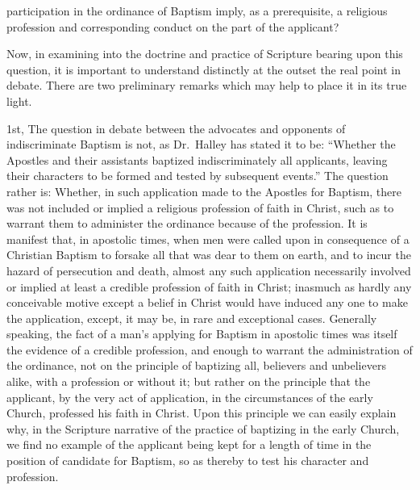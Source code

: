 \documentclass[]{book}
\begin{document}
participation in the ordinance of Baptism imply, as a prerequisite, a religious profession and corresponding conduct on the part of the applicant?

Now, in examining into the doctrine and practice of Scripture bearing upon this question, it is important to understand distinctly at the outset the real point in debate. There are two preliminary remarks which may help to place it in its true light.

1st, The question in debate between the advocates and opponents of indiscriminate Baptism is not, as Dr.~Halley has stated it to be: ``Whether the Apostles and their assistants baptized indiscriminately all applicants, leaving their characters to be formed and tested by subsequent events.'' The question rather is: Whether, in such application made to the Apostles for Baptism, there was not included or implied a religious profession of faith in Christ, such as to warrant them to administer the ordinance because of the profession. It is manifest that, in apostolic times, when men were called upon in consequence of a Christian Baptism to forsake all that was dear to them on earth, and to incur the hazard of persecution and death, almost any such application necessarily involved or implied at least a credible profession of faith in Christ; inasmuch as hardly any conceivable motive except a belief in Christ would have induced any one to make the application, except, it may be, in rare and exceptional cases. Generally speaking, the fact of a man's applying for Baptism in apostolic times was itself the evidence of a credible profession, and enough to warrant the administration of the ordinance, not on the principle of baptizing all, believers and unbelievers alike, with a profession or without it; but rather on the principle that the applicant, by the very act of application, in the circumstances of the early Church, professed his faith in Christ. Upon this principle we can easily explain why, in the Scripture narrative of the practice of baptizing in the early Church, we find no example of the applicant being kept for a length of time in the position of candidate for Baptism, so as thereby to test his character and profession.
\end{document}
